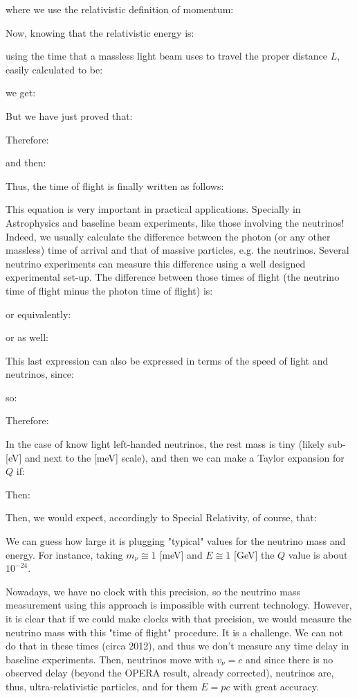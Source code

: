  	where we use the relativistic definition of momentum:
	
	Now, knowing that the relativistic energy is:
	
	using the time that a massless light beam uses to travel the proper distance $L$, easily calculated to be:
	
	 we get:
 	
	But we have just proved that:
	
 	Therefore:
 	
	and then:
 	
	Thus, the time of flight is finally written as follows:
 	
	This equation is very important in practical applications. Specially in Astrophysics and baseline beam experiments, like those involving the neutrinos! Indeed, we usually calculate the difference between the photon (or any other massless) time of arrival and that of massive particles, e.g. the neutrinos. Several neutrino experiments can measure this difference using a well designed experimental set-up. The difference between those times of flight (the neutrino time of flight minus the photon time of flight) is:
	
	or equivalently:
 	
	or as well:
 	
	This last expression can also be expressed in terms of the speed of light and neutrinos, since:
	
	so:
	
 	Therefore:
 	
	In the case of know light left-handed neutrinos, the rest mass is tiny (likely sub-[eV] and next to the [meV] scale), and then we can make a Taylor expansion for $Q$ if:
 	
	Then:
	
	Then, we would expect, accordingly to Special Relativity, of course, that:
	
 	We can guess how large it is plugging "typical" values for the neutrino mass and energy. For instance, taking $m_\nu\cong 1$ [meV] and $E\cong 1$ [GeV]  the $Q$ value is about $10^{-24}$.
 
	Nowadays, we have no clock with this precision, so the neutrino mass measurement using this approach is impossible with current technology. However, it is clear that if we could make clocks with that precision, we would measure the neutrino mass with this "time of flight" procedure. It is a challenge. We can not do that in these times (circa 2012), and thus we don't measure any time delay in baseline experiments. Then, neutrinos move with $v_\nu=c$ and since there is no observed delay (beyond the OPERA result, already corrected), neutrinos are, thus, ultra-relativistic particles, and for them $E=pc$ with great accuracy.
	
